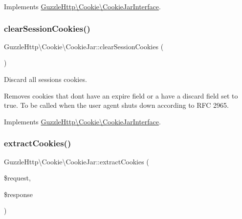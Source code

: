 Implements \hyperlink{interfaceGuzzleHttp_1_1Cookie_1_1CookieJarInterface_a2af2d155340b18fe8c901cbe8a7623ce}{Guzzle\+Http\textbackslash{}\+Cookie\textbackslash{}\+Cookie\+Jar\+Interface}.

\mbox{\label{classGuzzleHttp_1_1Cookie_1_1CookieJar_a2d9a31508947248644e43d5f86defdf2}} 
\subsubsection{\texorpdfstring{clear\+Session\+Cookies()}{clearSessionCookies()}}
{\footnotesize\ttfamily Guzzle\+Http\textbackslash{}\+Cookie\textbackslash{}\+Cookie\+Jar\+::clear\+Session\+Cookies (\begin{DoxyParamCaption}{ }\end{DoxyParamCaption})}

Discard all sessions cookies.

Removes cookies that don\textquotesingle{}t have an expire field or a have a discard field set to true. To be called when the user agent shuts down according to R\+FC 2965. 

Implements \hyperlink{interfaceGuzzleHttp_1_1Cookie_1_1CookieJarInterface_abd31effbb05237e8c730b03951b6d3ab}{Guzzle\+Http\textbackslash{}\+Cookie\textbackslash{}\+Cookie\+Jar\+Interface}.

\mbox{\label{classGuzzleHttp_1_1Cookie_1_1CookieJar_a430389ccb62792ad900095f6010ee483}} 
\subsubsection{\texorpdfstring{extract\+Cookies()}{extractCookies()}}
{\footnotesize\ttfamily Guzzle\+Http\textbackslash{}\+Cookie\textbackslash{}\+Cookie\+Jar\+::extract\+Cookies (\begin{DoxyParamCaption}\item[{\hyperlink{interfacePsr_1_1Http_1_1Message_1_1RequestInterface}{Request\+Interface}}]{\$request,  }\item[{\hyperlink{interfacePsr_1_1Http_1_1Message_1_1ResponseInterface}{Response\+Interface}}]{\$response }\end{DoxyParamCaption})}

